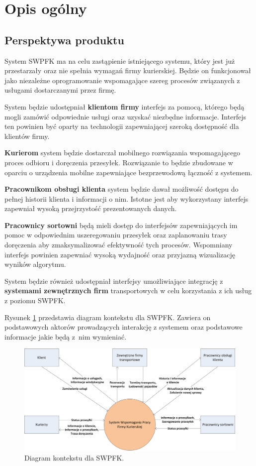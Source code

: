 \section{Opis ogólny}

\subsection{Perspektywa produktu}
System SWPFK ma na celu zastąpienie istniejącego systemu, który jest już przestarzały oraz nie spełnia wymagań firmy kurierskiej. Będzie on funkcjonował jako niezależne oprogramowanie wspomagające szereg procesów związanych z usługami dostarczanymi przez firmę.

System będzie udostępniał \textbf{klientom firmy} interfejs za pomocą, którego będą mogli zamówić odpowiednie usługi oraz uzyskać niezbędne informacje. Interfejs ten powinien być oparty na technologii zapewniającej szeroką dostępność dla klientów firmy.

\textbf{Kurierom} system będzie dostarczał mobilnego rozwiązania wspomagającego proces odbioru i doręczenia przesyłek. Rozwiązanie to będzie zbudowane w oparciu o urządzenia mobilne zapewniające bezprzewodową łączność z systemem.

\textbf{Pracownikom obsługi klienta} system będzie dawał możliwość dostępu do pełnej historii klienta i informacji o nim. Istotne jest aby wykorzystany interfejs zapewniał wysoką przejrzystość prezentowanych danych.

\textbf{Pracownicy sortowni} będą mieli dostęp do interfejsów zapewniających im pomoc w odpowiednim uszeregowaniu przesyłek oraz zaplanowaniu trasy doręczenia aby zmaksymalizować efektywność tych procesów. Wspomniany interfejs powinien zapewniać wysoką wydajność oraz przyjazną wizualizację wyników algorytmu.

System będzie również udostępniał interfejsy umożliwiające integrację z \textbf{systemami zewnętrznych firm} transportowych w celu korzystania z ich usług z poziomu SWPFK.

Rysunek \ref{diag:perspektywa} przedstawia diagram kontekstu dla SWPFK. Zawiera on podstawowych aktorów prowadzących interakcję z systemem oraz podstawowe informacje jakie będą z~nim wymieniać.

\begin{figure}[ht]
	\centering
	\includegraphics[width=\textwidth]{img/perspektywa}
	\caption{Diagram kontekstu dla SWPFK.}
	\label{diag:perspektywa}
\end{figure}

